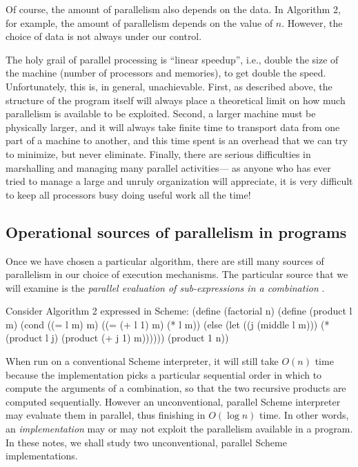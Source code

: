 Of course, the amount of parallelism also depends on the data.  In
Algorithm 2, for example, the amount of parallelism depends on the
value of $n$.  However, the choice of data is not always under our
control.

The holy grail of parallel processing is ``linear speedup'', i.e.,
double the size of the machine (number of processors and memories),
to get double the speed.  Unfortunately, this is, in general,
unachievable.  First, as described above, the structure of the program
itself will always place a theoretical limit on how much parallelism
is available to be exploited.  Second, a larger machine must be
physically larger, and it will always take finite time to transport
data from one part of a machine to another, and this time spent is an
overhead that we can try to minimize, but never eliminate.  Finally,
there are serious difficulties in marshalling and managing many
parallel activities--- as anyone who has ever tried to manage a large
and unruly organization will appreciate, it is very difficult to keep
all processors busy doing useful work all the time!


\subsection{Operational sources of parallelism in programs}

Once we have chosen a particular algorithm, there are still many
sources of parallelism in our choice of execution mechanisms.  The
particular source that we will examine is the {\em parallel evaluation
of sub-expressions in a combination} .

Consider Algorithm 2 expressed in Scheme:
\beginlisp
(define (factorial n)
  (define (product l m)
     (cond
      ((= l m) m)
      ((= (+ l 1) m) (* l m))
      (else (let ((j (middle l m)))
              (* (product l j)
                 (product (+ j 1) m))))))
  (product 1 n))
\endlisp

When run on a conventional Scheme interpreter, it will still take
$O(n)$ time because the implementation picks a particular sequential
order in which to compute the arguments of a combination, so that the
two recursive products are computed sequentially.  However an
unconventional, parallel Scheme interpreter may evaluate them in
parallel, thus finishing in $O(\log n)$ time.  In other words, an {\em
implementation\/} may or may not exploit the parallelism available in
a program.  In these notes, we shall study two unconventional,
parallel Scheme implementations.

